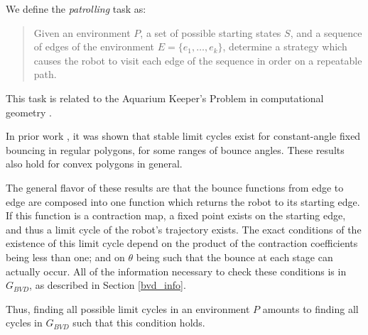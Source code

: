 \documentclass[]{styles/svproc}  %
\begin{document}
We define the \emph{patrolling} task as:

\begin{quotation}
Given an environment $P$, a set of possible starting states $S$, and
a sequence of edges of the environment $E = \{e_1, \ldots, e_k\}$,
determine a strategy which causes the robot to visit each edge of the sequence
in order on a repeatable path.
\end{quotation}

This task is related to the Aquarium Keeper's Problem in computational
geometry \cite{czyzowicz1991aquarium}.

In prior work \cite{NilBecLav17}, it was shown that stable limit cycles
exist for constant-angle fixed bouncing in regular polygons, for some ranges of bounce angles.
These results also hold for convex polygons in general.

The general flavor of these results are that the bounce functions from edge to
edge are composed into one function which returns the robot to its starting
edge. If this function is a contraction map, a fixed point exists on the
starting edge, and thus a limit cycle of the robot's trajectory exists. The
exact conditions of the existence of this limit cycle depend on the product of
the contraction coefficients being less than one; and on $\theta$ being such
that the bounce at each stage can actually occur. All of the information
necessary to check these conditions is in $G_{BVD}$, as described in Section
\ref{bvd_info}.

Thus, finding all possible limit cycles in an environment $P$ amounts to finding
all cycles in $G_{BVD}$ such that this condition holds.
\end{document}
